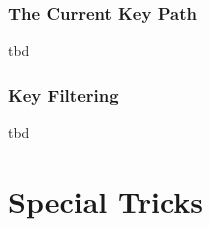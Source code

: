 \documentclass[a4paper,doc2]{ltxdoc}
\begin{document}
\subsubsection{The Current Key Path}
tbd

\subsubsection{Key Filtering}
tbd

\endgroup







\section{Special Tricks}
\end{document}
